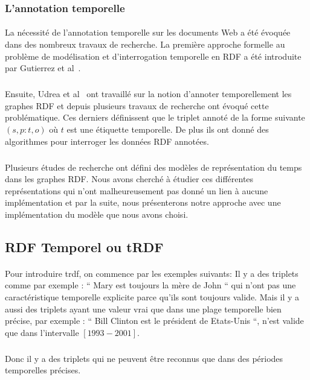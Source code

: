 \documentclass[12pt,a4]{report}
\begin{document}
\subsubsection{L'annotation temporelle}
\paragraph{}
La nécessité de l’annotation temporelle sur les documents Web a été évoquée dans des nombreux travaux de recherche. La première approche formelle au problème de modélisation et d’interrogation temporelle en RDF a été introduite par Gutierrez et al~\cite{gutierrez2005}.
\subparagraph{}
Ensuite, Udrea et al~\cite{udrea2006} ont travaillé sur la notion d'annoter temporellement les graphes RDF et depuis plusieurs travaux de recherche ont évoqué cette problématique.
Ces derniers définissent que le triplet annoté de la forme suivante $(s,p:t,o)$ où $t$ est une étiquette temporelle. De plus ils ont donné des algorithmes pour interroger les données RDF annotées.
\subparagraph{}	
Plusieurs études de recherche ont défini des modèles de représentation du temps dans les graphes RDF. Nous avons cherché à étudier ces différentes représentations qui n'ont malheureusement pas donné un lien à aucune implémentation et par la suite, nous présenterons notre approche avec une implémentation du modèle que nous avons choisi.  
\subsection{RDF Temporel ou tRDF}
\paragraph{}
Pour introduire \gls{trdf}, on commence par les exemples suivants:
\newline
Il y a des triplets comme par exemple : `` Mary est toujours la mère de John `` qui n'ont pas une caractéristique temporelle explicite parce qu’ils sont toujours valide. Mais il y a aussi des triplets ayant une valeur vrai que dans une plage temporelle bien précise, par exemple : `` Bill Clinton est le président de Etats-Unis ``, n'est valide que dans l'intervalle $[1993-2001]$.
\subparagraph{}
Donc il y a des triplets qui ne peuvent être reconnus que dans des périodes temporelles précises.
\end{document}
